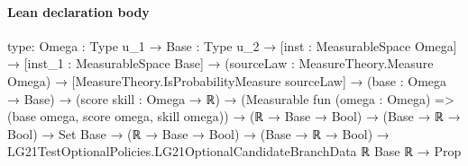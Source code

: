 \documentclass[10pt]{article}
\begin{document}
\paragraph{Lean declaration body}
\begin{ReviewVerbatim}
type:
{Omega : Type u_1} →
  {Base : Type u_2} →
    [inst : MeasurableSpace Omega] →
      [inst_1 : MeasurableSpace Base] →
        (sourceLaw : MeasureTheory.Measure Omega) →
          [MeasureTheory.IsProbabilityMeasure sourceLaw] →
            (base : Omega → Base) →
              (score skill : Omega → ℝ) →
                (Measurable fun (omega : Omega) => (base omega, score omega, skill omega)) →
                  (ℝ → Base → Bool) →
                    (Base → ℝ → Bool) →
                      Set Base →
                        (ℝ → Base → Bool) →
                          (Base → ℝ → Bool) → LG21TestOptionalPolicies.LG21OptionalCandidateBranchData ℝ Base ℝ → Prop


\end{ReviewVerbatim}
\end{document}
